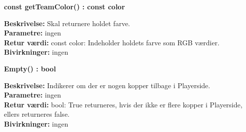 \documentclass[Arkitektur/System_main.tex]{subfiles}
\begin{document}
\textbf{const getTeamColor() : const color}
\begin{adjustwidth}{1cm}{0pt}
\textbf{Beskrivelse:} Skal returnere holdet farve.\\
\textbf{Parametre:} ingen \\[0.2cm]
\textbf{Retur værdi:} const color: Indeholder holdets farve som RGB værdier.\\[0.2cm]
\textbf{Bivirkninger:} ingen \\[0.2cm]
\end{adjustwidth}

\textbf{Empty() : bool}
\begin{adjustwidth}{1cm}{0pt}
\textbf{Beskrivelse:} Indikerer om der er nogen kopper tilbage i Playerside.\\
\textbf{Parametre:} ingen \\[0.2cm]
\textbf{Retur værdi:} bool: True returneres, hvis der ikke er flere kopper i Playerside, ellers returneres false.\\[0.2cm]
\textbf{Bivirkninger:} ingen \\[0.2cm]
\end{adjustwidth}
\end{document}
